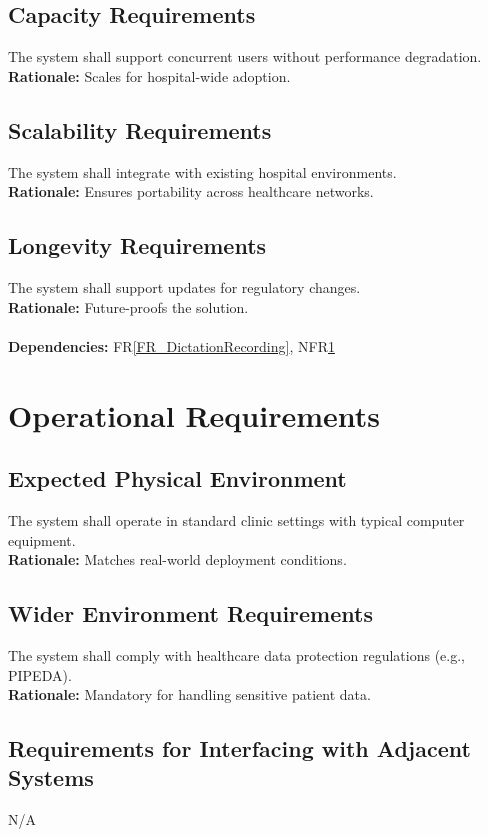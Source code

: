 \documentclass[12pt]{article}
\begin{document}
\subsection{Capacity Requirements}
The system shall support concurrent users without performance degradation.  \\
\textbf{Rationale:} Scales for hospital-wide adoption.

\subsection{Scalability Requirements}
The system shall integrate with existing hospital environments.  \\
\textbf{Rationale:} Ensures portability across healthcare networks.

\subsection{Longevity Requirements}
The system shall support updates for regulatory changes.  \\
\textbf{Rationale:} Future-proofs the solution. \\
  \\
\textbf{Dependencies:} FR\ref{FR_DictationRecording}, NFR\ref{NFR_Operational}

\section{Operational Requirements} \label{NFR_Operational}
\subsection{Expected Physical Environment}
The system shall operate in standard clinic settings with typical computer equipment.  \\
\textbf{Rationale:} Matches real-world deployment conditions.

\subsection{Wider Environment Requirements}
The system shall comply with healthcare data protection regulations (e.g., PIPEDA).  \\
\textbf{Rationale:} Mandatory for handling sensitive patient data.

\subsection{Requirements for Interfacing with Adjacent Systems}
N/A
\end{document}
